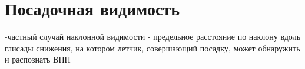 
\section{Посадочная видимость}
-частный случай наклонной видимости - предельное расстояние по наклону вдоль глисады снижения, на котором летчик, совершающий посадку, может обнаружить и распознать ВПП